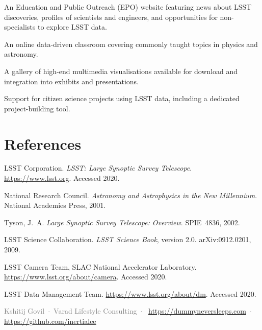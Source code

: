 \documentclass[12pt,a4paper]{article}
\begin{document}
\begin{description}[leftmargin=*]
  \item[General Public] An Education and Public Outreach (EPO) website
        featuring news about LSST discoveries, profiles of scientists and
        engineers, and opportunities for non-specialists to explore LSST data.
  \item[Formal Educators] An online data-driven classroom covering commonly
        taught topics in physics and astronomy.
  \item[Planetariums and Informal Science Centres] A gallery of high-end
        multimedia visualisations available for download and integration into
        exhibits and presentations.
  \item[Citizen Scientist Researchers] Support for citizen science projects
        using LSST data, including a dedicated project-building tool.
\end{description}

\newpage
\section*{References}

\begin{enumerate}[leftmargin=*,label={[\arabic*]}]
  \item LSST Corporation. \textit{LSST: Large Synoptic Survey Telescope}.
        \url{https://www.lsst.org}. Accessed 2020.
  \item National Research Council. \textit{Astronomy and Astrophysics in the
        New Millennium}. National Academies Press, 2001.
  \item Tyson, J.~A. \textit{Large Synoptic Survey Telescope: Overview}.
        SPIE~4836, 2002.
  \item LSST Science Collaboration. \textit{LSST Science Book}, version 2.0.
        arXiv:0912.0201, 2009.
  \item LSST Camera Team, SLAC National Accelerator Laboratory.
        \url{https://www.lsst.org/about/camera}. Accessed 2020.
  \item LSST Data Management Team.
        \url{https://www.lsst.org/about/dm}. Accessed 2020.
\end{enumerate}

\vfill
\begin{center}
  \small\textcolor{gray}{%
    Kshitij Govil~$\cdot$~Varad Lifestyle Consulting~$\cdot$~
    \url{https://dummyneversleeps.com}~$\cdot$~
    \url{https://github.com/inertialee}%
  }
\end{center}
\end{document}

